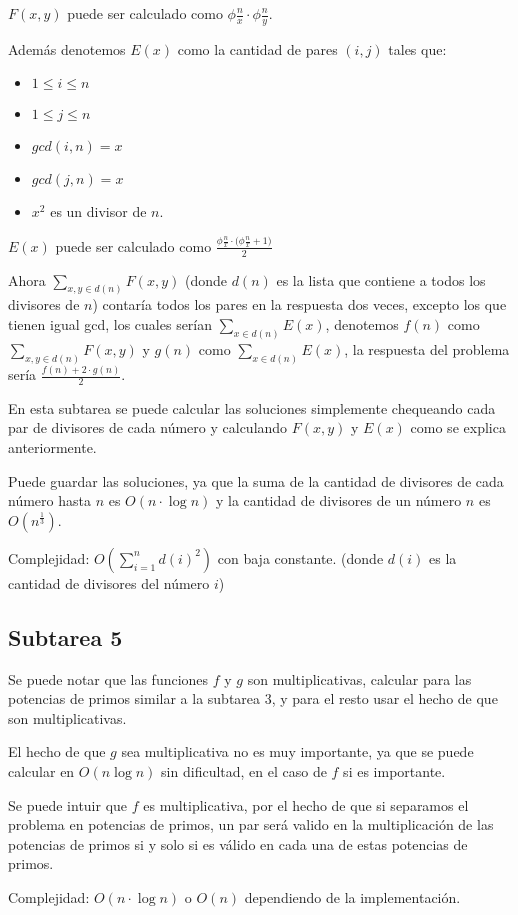 \(F(x, y)\) puede ser calculado como
\(\phi{\frac{n}{x}} \cdot \phi{\frac{n}{y}}\).

Además denotemos \(E(x)\) como la cantidad de pares \((i, j)\) tales
que:

\begin{itemize}
\tightlist
\item
  \(1 \leq i \leq n\)
\item
  \(1 \leq j \leq n\)
\item
  \(gcd(i, n) = x\)
\item
  \(gcd(j, n) = x\)
\item
  \(x^2\) es un divisor de \(n\).
\end{itemize}

\(E(x)\) puede ser calculado como
\(\frac{\phi{\frac{n}{x}} \cdot (\phi{\frac{n}{x} + 1)}}{2}\)

Ahora \(\sum_{x,y \in d(n)} F(x,y)\) (donde \(d(n)\) es la lista que
contiene a todos los divisores de \(n\)) contaría todos los pares en la
respuesta dos veces, excepto los que tienen igual gcd, los cuales serían
\(\sum_{x \in d(n)} E(x)\), denotemos \(f(n)\) como
\(\sum_{x,y \in d(n)} F(x,y)\) y \(g(n)\) como
\(\sum_{x \in d(n)} E(x)\), la respuesta del problema sería
\(\frac{f(n) + 2\cdot g(n)}{2}\).

En esta subtarea se puede calcular las soluciones simplemente chequeando
cada par de divisores de cada número y calculando \(F(x, y)\) y \(E(x)\)
como se explica anteriormente.

Puede guardar las soluciones, ya que la suma de la cantidad de divisores
de cada número hasta \(n\) es \(O(n\cdot \log n)\) y la cantidad de
divisores de un número \(n\) es \(O(n^{\frac{1}{3}})\).

Complejidad: \(O(\sum_{i=1}^{n} d(i)^2)\) con baja constante. (donde
\(d(i)\) es la cantidad de divisores del número \(i\))

\hypertarget{subtarea-5}{%
\subsection{Subtarea 5}\label{subtarea-5}}

Se puede notar que las funciones \(f\) y \(g\) son multiplicativas,
calcular para las potencias de primos similar a la subtarea 3, y para el
resto usar el hecho de que son multiplicativas.

El hecho de que \(g\) sea multiplicativa no es muy importante, ya que se
puede calcular en \(O(n\log{n})\) sin dificultad, en el caso de \(f\) si
es importante.

Se puede intuir que \(f\) es multiplicativa, por el hecho de que si
separamos el problema en potencias de primos, un par será valido en la
multiplicación de las potencias de primos si y solo si es válido en cada
una de estas potencias de primos.

Complejidad: \(O(n\cdot \log{n})\) o \(O(n)\) dependiendo de la
implementación.
